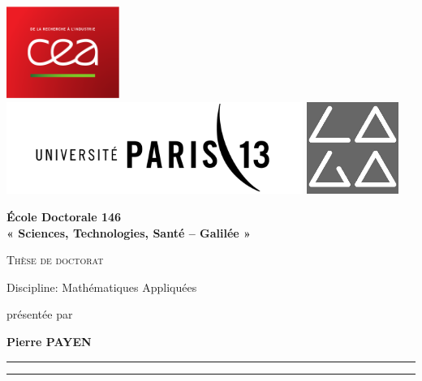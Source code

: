 \hypersetup{pageanchor=false}
\thispagestyle{empty}
\begin{titlepage}
\includegraphics[height = 3cm]{images/logo/CEA.pdf}
\hfill
\includegraphics[height = 3cm]{images/logo/P13.png}
\hfill
\includegraphics[height = 3cm]{images/logo/laga.jpg}


\begin{center}
{\Large \textbf{École Doctorale 146 \\« Sciences, Technologies, Santé – Galilée »}}


{\Huge \textsc{Thèse de doctorat}}


{
    \LARGE
    Discipline: Mathématiques Appliquées
}


{
    \large
    présentée par
}

{
    \LARGE
    \textbf{Pierre PAYEN}
    \\
}

\hrule
{}
{\LARGE \textbf{\doctitlefr}}
\hrule


\end{center}
\end{titlepage}
